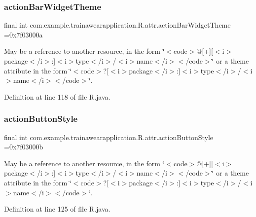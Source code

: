 \subsubsection{\texorpdfstring{actionBarWidgetTheme}{actionBarWidgetTheme}}
{\footnotesize\ttfamily final int com.\+example.\+trainawearapplication.\+R.\+attr.\+action\+Bar\+Widget\+Theme =0x7f03000a\hspace{0.3cm}{\ttfamily [static]}}

May be a reference to another resource, in the form \char`\"{}$<$code$>$@\mbox{[}+\mbox{]}\mbox{[}$<$i$>$package$<$/i$>$\+:\mbox{]}$<$i$>$type$<$/i$>$/$<$i$>$name$<$/i$>$$<$/code$>$\char`\"{} or a theme attribute in the form \char`\"{}$<$code$>$?\mbox{[}$<$i$>$package$<$/i$>$\+:\mbox{]}$<$i$>$type$<$/i$>$/$<$i$>$name$<$/i$>$$<$/code$>$\char`\"{}. 

Definition at line 118 of file R.\+java.

\mbox{\label{classcom_1_1example_1_1trainawearapplication_1_1_r_1_1attr_ac4e250813f0a7438fc88cd944565d7bb}} 
\subsubsection{\texorpdfstring{actionButtonStyle}{actionButtonStyle}}
{\footnotesize\ttfamily final int com.\+example.\+trainawearapplication.\+R.\+attr.\+action\+Button\+Style =0x7f03000b\hspace{0.3cm}{\ttfamily [static]}}

May be a reference to another resource, in the form \char`\"{}$<$code$>$@\mbox{[}+\mbox{]}\mbox{[}$<$i$>$package$<$/i$>$\+:\mbox{]}$<$i$>$type$<$/i$>$/$<$i$>$name$<$/i$>$$<$/code$>$\char`\"{} or a theme attribute in the form \char`\"{}$<$code$>$?\mbox{[}$<$i$>$package$<$/i$>$\+:\mbox{]}$<$i$>$type$<$/i$>$/$<$i$>$name$<$/i$>$$<$/code$>$\char`\"{}. 

Definition at line 125 of file R.\+java.

\mbox{\label{classcom_1_1example_1_1trainawearapplication_1_1_r_1_1attr_a56512c4afbcaf8f853013bc4c50d756a}} 
